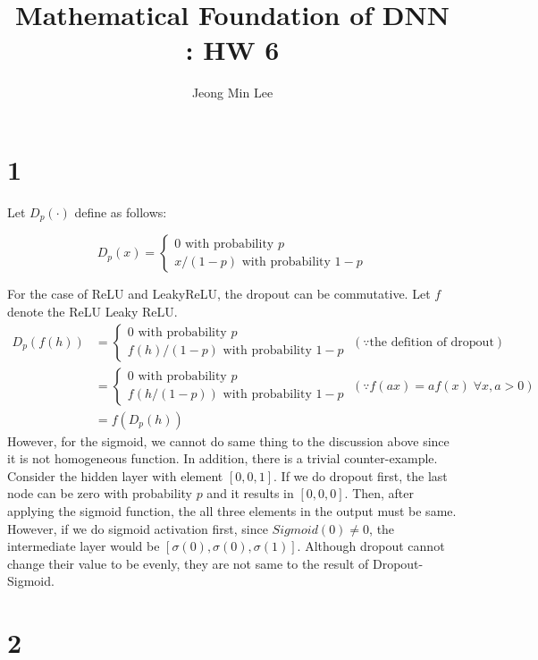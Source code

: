 \documentclass[10pt]{article}
\title{\textbf{Mathematical Foundation of DNN : HW 6}}
\author{Jeong Min Lee}
\begin{document}
\maketitle

\section*{1}
Let $D_p(\cdot)$ define as follows:

\begin{equation}
    D_p(x) = \begin{cases}
        0 \text{ with probability }p \\
        x/(1-p) \text{ with probability } 1-p
    \end{cases}
\end{equation}

For the case of ReLU and LeakyReLU, the dropout can be commutative. Let $f$ denote the ReLU Leaky ReLU.
\begin{align*}
    D_p(f(h)) &= \begin{cases}
        0 \text{ with probability } p \\
        f(h)/(1-p) \text{ with probability } 1-p
    \end{cases} \; (\because \text{the defition of dropout})\\&= \begin{cases}
        0 \text{ with probability } p \\
        f(h/(1-p)) \text{ with probability } 1-p
    \end{cases} \; (\because f(ax) = af(x)\; \forall x, a>0) \\ &= f(D_p(h))
\end{align*}
However, for the sigmoid, we cannot do same thing to the discussion above since it is not homogeneous function. 
In addition, there is a trivial counter-example. Consider the hidden layer with element $[0,0,1]$. If we do dropout first, 
the last node can be zero with probability $p$ and it results in $[0,0,0]$. Then, after applying the sigmoid function, the all three elements in the output must be same. 
However, if we do sigmoid activation first, since $Sigmoid(0) \neq 0 $, the intermediate layer would be $[\sigma(0),\sigma(0),\sigma(1)]$. 
Although dropout cannot change their value to be evenly, they are not same to the result of Dropout-Sigmoid.

\section*{2}
\end{document}
